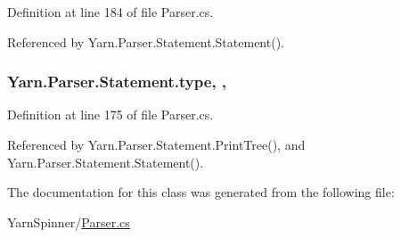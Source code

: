 Definition at line 184 of file Parser.\-cs.



Referenced by Yarn.\-Parser.\-Statement.\-Statement().

\hypertarget{a00156_aa3fa0eb260e412720562ce06b7dc06fe}{
\subsubsection[{type}]{ Yarn.\-Parser.\-Statement.\-type\hspace{0.3cm}{\ttfamily [get]}, {\ttfamily [set]}, {\ttfamily [package]}}}\label{a00156_aa3fa0eb260e412720562ce06b7dc06fe}


Definition at line 175 of file Parser.\-cs.



Referenced by Yarn.\-Parser.\-Statement.\-Print\-Tree(), and Yarn.\-Parser.\-Statement.\-Statement().



The documentation for this class was generated from the following file\-:\begin{DoxyCompactItemize}
\item 
Yarn\-Spinner/\hyperlink{a00295}{Parser.\-cs}\end{DoxyCompactItemize}
